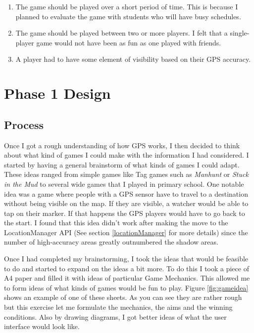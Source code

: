 \documentclass{l4proj}
\begin{document}
\begin{enumerate}
    \item The game should be played over a short period of time. This is because I planned to evaluate the game with students who will have busy schedules.
    \item The game should be played between two or more players. I felt that a single-player game would not have been as fun as one played with friends.
    \item A player had to have some element of visibility based on their GPS accuracy. 
\end{enumerate}

\chapter{Phase 1 Design}
\label{phase1design}

\section{Process}
\label{phase1designprocess}
Once I got a rough understanding of how GPS works, I then decided to think about what kind of games I could make
with the information I had considered. I started by having a general brainstorm of what kinds of games I could adapt.
These ideas ranged from simple games like Tag games such as \emph{Manhunt} or \emph{Stuck in the Mud} to several wide
games that I played in primary school. One notable idea was a game where people with a GPS sensor have to travel to a
destination without being visible on the map. If they are visible, a watcher would be able to tap on their marker. If
that happens the GPS players would have to go back to the start. I found that this idea didn't work after making the
move to the LocationManager API (See section \ref{locationManager} for more details) since the number of high-accuracy
areas greatly outnumbered the shadow areas.

Once I had completed my brainstorming, I took the ideas that would be feasible to do and started to expand on the ideas a
bit more. To do this I took a piece of A4 paper and filled it with ideas of particular Game Mechanics. This allowed me
to form ideas of what kinds of games would be fun to play. Figure \ref{fig:gameidea} shows an example of one of these sheets.
As you can see they are rather rough but this exercise let me formulate the mechanics, the aims and the winning conditions.
Also by drawing diagrams, I got better ideas of what the user interface would look like.
\end{document}
